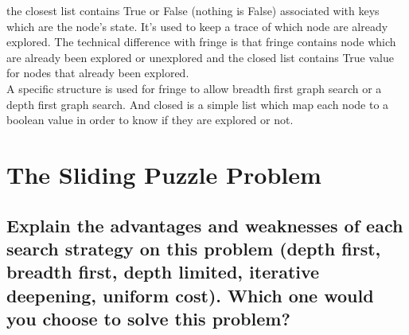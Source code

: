 \documentclass[a4paper,10pt]{article}
\begin{document}
	the closest list contains True or False (nothing is False) associated with keys which are the node's state. It's used to keep a trace of which node are already explored. The technical difference with fringe is that fringe contains node which are already been explored or unexplored and the closed list contains True value for nodes that already been explored. \\ A specific structure is used for fringe to allow breadth first graph search or a depth first graph search. And closed is a simple list which map each node to a boolean value in order to know if they are explored or not.
	
	
\section{The Sliding Puzzle Problem}

	\subsection{Explain the advantages and weaknesses of each search strategy on this problem (depth first, breadth first, depth limited, iterative deepening, uniform cost). Which one would you choose to solve this problem?}
	
\end{document}
